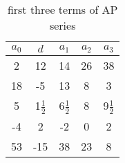 

\begin{table}[h]
  \centering
  \begin{tabular}{|c|c|c|c|c|}
    \hline
    \(a_0\) & \(d\)& \(a_1\) & \(a_2\) & \(a_3\) \\
    \hline
    2 & 12 & 14 & 26 & 38 \\
    18 & -5 & 13 & 8 & 3 \\
    5 & 1$\frac{1}{2}$  & 6$\frac{1}{2}$ & 8 & 9$\frac{1}{2}$\\
    -4 & 2 & -2 & 0 & 2 \\
    53 & -15 & 38 & 23 & 8 \\
    \hline
  \end{tabular}
  \caption{first three terms of AP series}
  \label{tab:xn}
\end{table}


